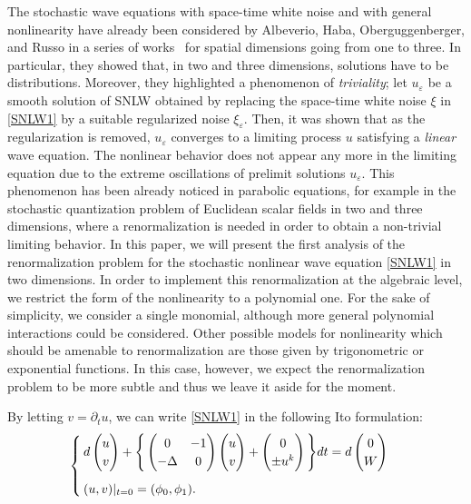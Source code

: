 \documentclass[letterpaper, 11pt,  reqno]{amsart}
\newcommand{\1}{\hspace{0.5mm}\text{I}\hspace{0.5mm}}
\newcommand{\Dl}{\Delta}
\newcommand{\eps}{\varepsilon}
\newcommand{\dt}{\partial_t}
\numberwithin{equation}{section}
\numberwithin{theorem}{section}
\begin{document}
The stochastic wave equations with space-time white noise and with general nonlinearity 
have already been considered by Albeverio, Haba, Oberguggenberger, and Russo in a series of works~\cite{russo1,russo2,russo3,russo4} 
for spatial dimensions going from one to three. 
In particular, they showed that, in two and three dimensions, solutions have to be distributions.
Moreover, they highlighted a phenomenon of \emph{triviality};
let $u_\eps$ be a smooth solution of SNLW obtained by replacing the space-time white noise $\xi$
in \eqref{SNLW1}
by a suitable regularized noise  $\xi_\eps$.
Then, it was shown that as the regularization is removed,
$u_\eps$ converges  to a limiting process $u$
satisfying  a \emph{linear} wave equation. 
The nonlinear behavior does not appear any more in the limiting equation due to the extreme oscillations of prelimit solutions $u_\eps$. This phenomenon has been already noticed in parabolic equations, for example in the stochastic quantization problem of Euclidean scalar fields in two and three 
dimensions,
where 
 a renormalization is needed in order to obtain a non-trivial limiting behavior. 
 In this paper,  we will present the first analysis of the renormalization problem for the stochastic nonlinear wave equation \eqref{SNLW1} in two dimensions. 
 In order to  implement this renormalization at the algebraic level,
  we restrict   the form of the nonlinearity to a polynomial one. For the sake of simplicity, we consider a single monomial,  although 
 more general polynomial interactions could be considered. Other possible models for nonlinearity which should be amenable to renormalization are those given by trigonometric or exponential functions.
 In this case, however,  we expect the renormalization problem to be more subtle and 
 thus we leave it aside for the moment.



By letting $v = \dt u$, we can write \eqref{SNLW1}
in the following Ito formulation:
\begin{align}
\begin{cases}
d  \begin{pmatrix}
u \\ v
\end{pmatrix}
+ \Bigg\{
\begin{pmatrix}
0 & -1\\
-\Dl & 0
\end{pmatrix}
 \begin{pmatrix}
u \\ v 
\end{pmatrix}
+  
\begin{pmatrix}
0 \\ \pm u^k
\end{pmatrix}
\Bigg\} dt 
 = d \begin{pmatrix}
0  \\W
\end{pmatrix}\\
\rule{0mm}{6mm}(u, v) |_{t = 0} = (\phi_0, \phi_1).
\end{cases}
\label{SNLW2}
\end{align}
\end{document}
